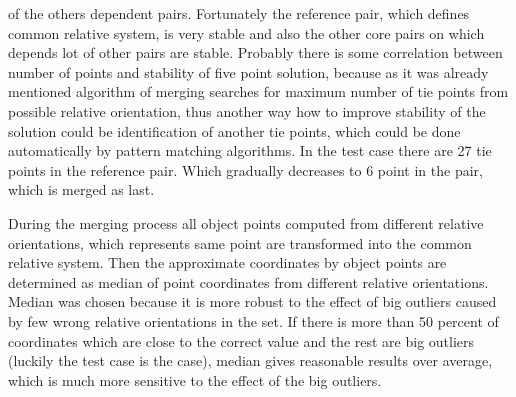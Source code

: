 \documentclass[a4paper,12pt]{report}
\begin{document}
of the others dependent pairs. Fortunately the reference pair, which defines common relative system, is very stable and also 
the other  core pairs on which depends lot of other pairs are stable. Probably there is some correlation between number 
of points and stability of five point solution, because as it was already mentioned algorithm of merging searches 
for maximum number of tie points from possible relative orientation, thus another way how to improve stability of the solution 
could be identification of another tie points, which could be done automatically by pattern matching algorithms. 
In the test case there 
are 27 tie points in the reference pair. Which gradually decreases to 6 point in the pair, which is merged as last.

During the merging process all object points computed from different relative orientations, which represents same point are 
transformed into  the common relative system. Then the approximate coordinates by object points are determined as median
of point coordinates from different relative orientations. Median was chosen because it is more robust to the effect of 
big outliers caused by few wrong relative orientations in the set. If there is more than 50 percent of coordinates 
which are close to the correct value and the rest are big outliers (luckily the test case is the case), median gives reasonable results over average,
which is much more sensitive to the effect of the big outliers. 
\end{document}
